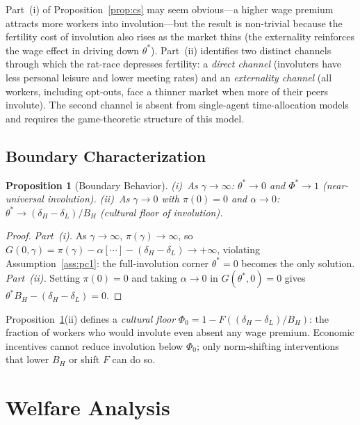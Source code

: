 \documentclass[12pt]{article}
\theoremstyle{plain}
\newtheorem{proposition}{Proposition}
\theoremstyle{definition}
\theoremstyle{remark}
\newcommand{\tstar}{\theta^{*}}
\newcommand{\Phistar}{\Phi^{*}}
\begin{document}
Part~(i) of Proposition~\ref{prop:cs} may seem obvious---a higher wage premium
attracts more workers into involution---but the result is non-trivial because the
fertility cost of involution also rises as the market thins (the externality
reinforces the wage effect in driving down $\tstar$).  Part~(ii) identifies two
distinct channels through which the rat-race depresses fertility: a \emph{direct
channel} (involuters have less personal leisure and lower meeting rates) and an
\emph{externality channel} (all workers, including opt-outs, face a thinner market
when more of their peers involute).  The second channel is absent from single-agent
time-allocation models and requires the game-theoretic structure of this model.

\subsection{Boundary Characterization}

\begin{proposition}[Boundary Behavior]
\label{prop:boundary}
(i)~As $\gamma \to \infty$: $\tstar \to 0$ and $\Phistar \to 1$
(near-universal involution).
(ii)~As $\gamma \to 0$ with $\pi(0) = 0$ and $\alpha \to 0$: $\tstar \to
(\delta_{H} - \delta_{L})/B_{H}$ (cultural floor of involution).
\end{proposition}

\begin{proof}
\emph{Part~(i).}  As $\gamma \to \infty$, $\pi(\gamma) \to \infty$, so
$G(0,\gamma) = \pi(\gamma) - \alpha[\cdots] - (\delta_H - \delta_L) \to +\infty$,
violating Assumption~\ref{ass:pc1}: the full-involution corner $\tstar = 0$
becomes the only solution.
\emph{Part~(ii).}  Setting $\pi(0) = 0$ and taking $\alpha \to 0$ in
$G(\tstar,0) = 0$ gives $\tstar B_{H} - (\delta_{H} - \delta_{L}) = 0$.
\end{proof}

Proposition~\ref{prop:boundary}(ii) defines a \emph{cultural floor} $\Phi_{0} =
1 - F((\delta_{H} - \delta_{L})/B_{H})$: the fraction of workers who would involute
even absent any wage premium.  Economic incentives cannot reduce involution below
$\Phi_{0}$; only norm-shifting interventions that lower $B_{H}$ or shift $F$ can
do so.

\section{Welfare Analysis}
\label{sec:welfare}
\end{document}
